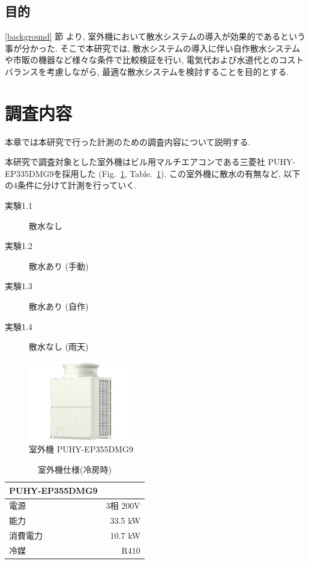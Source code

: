 \documentclass[a4j,fleqn,dvipdfmx,uplatex]{jsarticle}
\newcommand{\figref}[1]{Fig.\ \ref{#1}}
\newcommand{\tableref}[1]{Table.\ \ref{#1}}
\newcommand{\subsecref}[1]{\ref{#1}\hspace{0.2zw} 節}
\begin{document}
\subsection{目的}\label{purpose}
\subsecref{background} より, 室外機において散水システムの導入が効果的であるという事が分かった. 
そこで本研究では, 散水システムの導入に伴い自作散水システムや市販の機器など様々な条件で比較検証を行い, 
電気代および水道代とのコストバランスを考慮しながら, 最適な散水システムを検討することを目的とする. 

\section{調査内容}\label{sec2}
本章では本研究で行った計測のための調査内容について説明する. 

本研究で調査対象とした室外機はビル用マルチエアコンである三菱社 
PUHY-EP335DMG9\cite{condensing_unit}を採用した (\figref{fig:condensing_unit}, \tableref{table:hard}). 
この室外機に散水の有無など, 以下の4条件に分けて計測を行っていく.  

\begin{description}
  \item[  実験1.1 ] 散水なし
  \item[  実験1.2 ] 散水あり (手動)
  \item[  実験1.3 ] 散水あり (自作)
  \item[  実験1.4 ] 散水なし (雨天)
\end{description}

\begin{figure}[htb]
  \centering
  \includegraphics[width=0.7\linewidth]{img/PUHY-EP335DMG9.jpg}
  \caption{室外機 PUHY-EP355DMG9}
  \label{fig:condensing_unit}
\end{figure}

\begin{table}[htb]
  \caption{室外機仕様(冷房時)}
  \label{table:hard}
  \centering
  \begin{tabular}{lr}
    PUHY-EP355DMG9 & \\
    \hline \hline
    電源 & 3相 200V \\
    能力 & 33.5 kW \\
    消費電力 & 10.7 kW \\
    冷媒 & R410 \\
    \hline
  \end{tabular}
\end{table}
\end{document}
